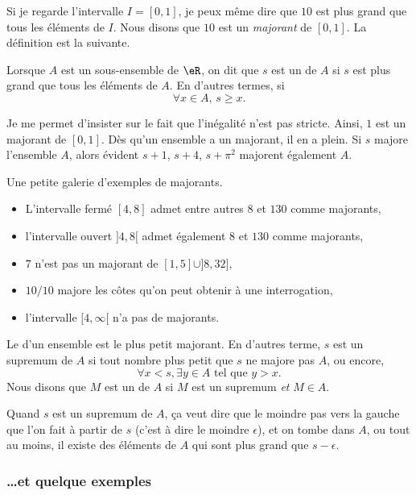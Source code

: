   Si je regarde l'intervalle $I=[0,1]$, je peux même dire que $10$ est plus grand que tous les éléments de $I$. Nous disons que $10$ est un \emph{majorant} de $[0,1]$. La définition est la suivante.
\begin{definition}
Lorsque $A$ est un sous-ensemble de $\eR$, on dit que $s$ est un  de $A$ si $s$ est plus grand que tous les éléments de $A$. En d'autres termes, si
\[
  \forall x\in A,\,s\geq x.
\]
\end{definition}
Je me permet d'insister sur le fait que l'inégalité n'est pas stricte. Ainsi, $1$ est un majorant de $[0,1]$. Dès qu'un ensemble a un majorant, il en a plein. Si $s$ majore l'ensemble $A$, alors évident $s+1$, $s+4$, $s+\pi^2$ majorent également $A$.

\begin{example}
Une petite galerie d'exemples de majorants.
\begin{itemize}
\item L'intervalle fermé $[4,8]$ admet entre autres $8$ et $130$ comme majorants,
\item l'intervalle ouvert $]4,8[$ admet également $8$ et $130$ comme majorants,
\item $7$ n'est pas un majorant de $[1,5]\cup]8,32]$,
\item $10/10$ majore les côtes qu'on peut obtenir à une interrogation,
\item l'intervalle $[4,\infty[$ n'a pas de majorants.
\end{itemize}
\end{example}

\begin{definition}
Le  d'un ensemble est le plus petit majorant. En d'autres terme, $s$ est un supremum de $A$ si tout nombre plus petit que $s$ ne majore pas $A$, ou encore,
\[
  \forall x<s,\exists y\in A\text{ tel que } y>x.
\]
Nous disons que $M$ est un  de $A$ si $M$ est un supremum \emph{et} $M\in A$.
\end{definition}
Quand $s$ est un supremum de $A$, ça veut dire que le moindre pas vers la gauche que l'on fait à partir de $s$ (c'est à dire le moindre $\epsilon$), et on tombe dans $A$, ou tout au moins, il existe des éléments de $A$ qui sont plus grand que $s-\epsilon$.

\subsubsection{\ldots et quelque exemples}

